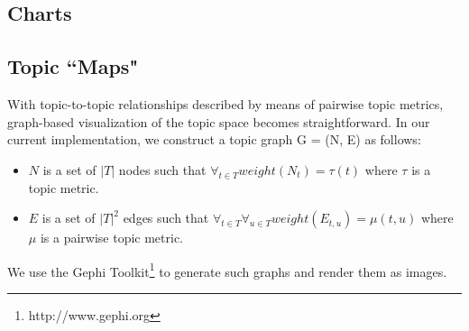 \subsection{Charts}



\subsection{Topic ``Maps"}
With topic-to-topic relationships described by means of pairwise topic metrics,
graph-based visualization of the topic space becomes straightforward. In our
current implementation, we construct a topic graph G = (N, E) as follows:
\begin{itemize}
\item $N$ is a set of $|T|$ nodes such that $\forall_{t\in T} weight(N_{t}) =
\tau(t)$ where $\tau$ is a topic metric.
\item $E$ is a set of $|T|^2$ edges such that $\forall_{t\in T}\forall_{u\in T}
weight(E_{t,u}) = \mu(t,u)$ where $\mu$ is a pairwise topic metric.
\end{itemize}

We use the Gephi Toolkit\footnote{http://www.gephi.org} to generate such graphs
and render them as images.

